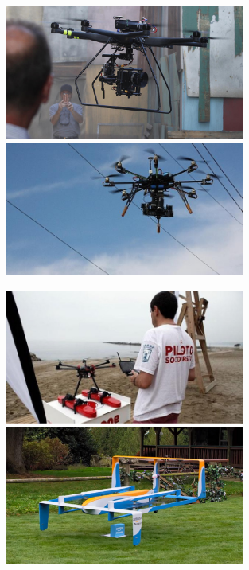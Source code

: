 \documentclass[notes,slidesec,a4]{seminar}
\begin{document}
\begin{hslide}
\begin{minipage}[t]{0.5\textwidth}
\begin{center}
\begin{figure}
\includegraphics[width=0.7\textwidth]{img/dronefilm}
\includegraphics[width=0.7\textwidth]{img/dronendesa}
\end{figure}
\end{center}
\end{minipage}
\begin{minipage}[t]{0.5\textwidth}
\begin{center}
\begin{figure}
\includegraphics[width=0.7\textwidth]{img/socorrista}
\includegraphics[width=0.7\textwidth]{img/amazon}

\end{figure}
\end{center}
\end{minipage}
\end{hslide}
\end{document}
